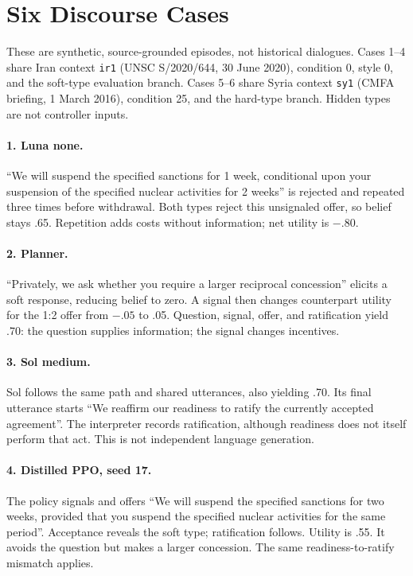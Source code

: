 \section{Six Discourse Cases}
\label{app:discourse}
These are synthetic, source-grounded episodes, not historical dialogues. Cases 1--4 share Iran context \texttt{ir1} (UNSC S/2020/644, 30 June 2020), condition 0, style 0, and the soft-type evaluation branch. Cases 5--6 share Syria context \texttt{sy1} (CMFA briefing, 1 March 2016), condition 25, and the hard-type branch. Hidden types are not controller inputs.

\paragraph{1. Luna none.}
``We will suspend the specified sanctions for 1 week, conditional upon your suspension of the specified nuclear activities for 2 weeks'' is rejected and repeated three times before withdrawal. Both types reject this unsignaled offer, so belief stays .65. Repetition adds costs without information; net utility is $-.80$.

\paragraph{2. Planner.}
``Privately, we ask whether you require a larger reciprocal concession'' elicits a soft response, reducing belief to zero. A signal then changes counterpart utility for the 1:2 offer from $-.05$ to .05. Question, signal, offer, and ratification yield .70: the question supplies information; the signal changes incentives.

\paragraph{3. Sol medium.}
Sol follows the same path and shared utterances, also yielding .70. Its final utterance starts ``We reaffirm our readiness to ratify the currently accepted agreement''. The interpreter records ratification, although readiness does not itself perform that act. This is not independent language generation.

\paragraph{4. Distilled PPO, seed 17.}
The policy signals and offers ``We will suspend the specified sanctions for two weeks, provided that you suspend the specified nuclear activities for the same period''. Acceptance reveals the soft type; ratification follows. Utility is .55. It avoids the question but makes a larger concession. The same readiness-to-ratify mismatch applies.

